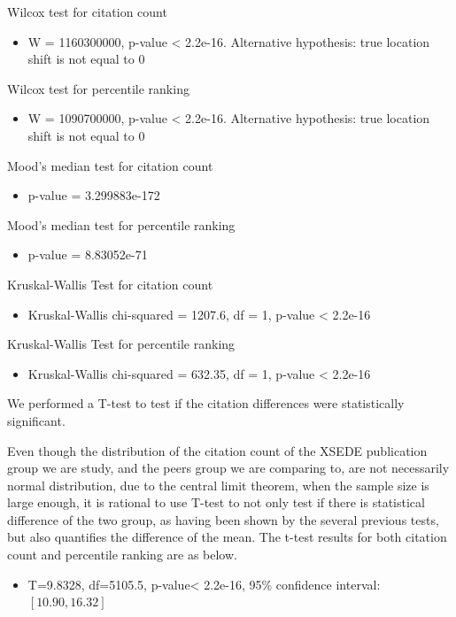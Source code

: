 \documentclass{sig-alternate}
\begin{document}
Wilcox test for citation count
\begin{itemize}
\item W = 1160300000, p-value < 2.2e-16. Alternative hypothesis: true location shift is not equal to 0
\end{itemize}

Wilcox test for percentile ranking
\begin{itemize}
\item W = 1090700000, p-value < 2.2e-16. Alternative hypothesis: true location shift is not equal to 0
\end{itemize}

Mood's median test for citation count
\begin{itemize}
\item p-value = 3.299883e-172
\end{itemize}

Mood's median test for percentile ranking
\begin{itemize}
\item p-value = 8.83052e-71
\end{itemize}

Kruskal-Wallis Test for citation count
\begin{itemize}
\item Kruskal-Wallis chi-squared = 1207.6, df = 1, p-value < 2.2e-16
\end{itemize}

Kruskal-Wallis Test for percentile ranking
\begin{itemize}
\item Kruskal-Wallis chi-squared = 632.35, df = 1, p-value < 2.2e-16
\end{itemize}

We performed a T-test to
test if the citation differences were statistically significant.

Even though the distribution of the citation count of the XSEDE publication group we are study,
and the peers group we are comparing to, are not necessarily normal distribution, due to the central limit theorem,
when the sample size is large enough, it is rational to use T-test to not only test if there is statistical
difference of the two group, as having been shown by the several previous tests, but also quantifies the
difference of the mean. The t-test results for both citation count and percentile ranking are as below.

\begin{itemize}
\item T=9.8328, df=5105.5, p-value< 2.2e-16, 95\% confidence interval: $[10.90, 16.32]$
\end{itemize}
\end{document}
